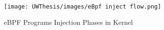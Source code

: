 \documentclass [11pt, proquest] {uwthesis}[2020/02/24]
\begin{document}

\begin{figure}[H]
\texttt{[image: UWThesis/images/eBpf inject flow.png]}
\caption{eBPF Programs Injection Phases in Kernel}
\label{fig:eBPF-injection}
\end{figure}
\end{document}
